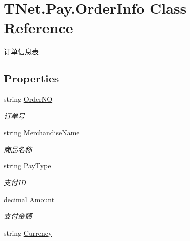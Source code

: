 \hypertarget{class_t_net_1_1_pay_1_1_order_info}{}\section{T\+Net.\+Pay.\+Order\+Info Class Reference}
\label{class_t_net_1_1_pay_1_1_order_info}


订单信息表  


\subsection*{Properties}
\begin{DoxyCompactItemize}
\item 
string \mbox{\hyperlink{class_t_net_1_1_pay_1_1_order_info_aaf96f749dd7fe8273cf89f9545e734f5}{Order\+NO}}
\begin{DoxyCompactList}\small\item\em 订单号 \end{DoxyCompactList}\item 
string \mbox{\hyperlink{class_t_net_1_1_pay_1_1_order_info_a4f533bf84f096a4211ddda3cec2a2274}{Merchandise\+Name}}
\begin{DoxyCompactList}\small\item\em 商品名称 \end{DoxyCompactList}\item 
string \mbox{\hyperlink{class_t_net_1_1_pay_1_1_order_info_a23e25a13b4d19998cb6d02f25a4cc3ec}{Pay\+Type}}
\begin{DoxyCompactList}\small\item\em 支付\+ID \end{DoxyCompactList}\item 
decimal \mbox{\hyperlink{class_t_net_1_1_pay_1_1_order_info_abd4991e474b31dc730d62a33361d45ee}{Amount}}
\begin{DoxyCompactList}\small\item\em 支付金额 \end{DoxyCompactList}\item 
string \mbox{\hyperlink{class_t_net_1_1_pay_1_1_order_info_a107194c256113b4b3ff8a23b08242ebf}{Currency}}

\end{DoxyCompactItemize}

